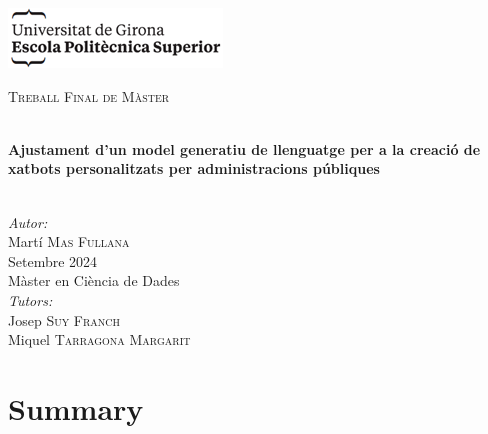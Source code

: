 \documentclass[a4paper,12pt,twoside]{ThesisStyle}
\begin{document}
\newpage
\hypersetup{pageanchor=false}
\begin{titlepage}

  \includegraphics[scale=0.9]{imatges/logo_eps.png} \\[1cm]
  \begin{center}
    \textsc{\Large Treball Final de Màster} \\[1cm]

    \begin{spacing}{2}
      \HRule \\
      \textbf{\Huge Ajustament d'un model generatiu de llenguatge per a la creació de xatbots personalitzats per administracions públiques} \\
      \HRule \\[0.5cm]
    \end{spacing}

    {
    \large
    \emph{Autor:} \\
    Martí \textsc{Mas Fullana} \\[1cm]
    Setembre 2024 \\[1cm]
    Màster en Ciència de Dades \\[1cm]
    \emph{Tutors:} \\
    Josep \textsc{Suy Franch} \\
    Miquel \textsc{Tarragona Margarit} \\
    }

  \end{center}
\end{titlepage}
\hypersetup{pageanchor=true}

\titlepage




\chapter*{Summary}
\end{document}
